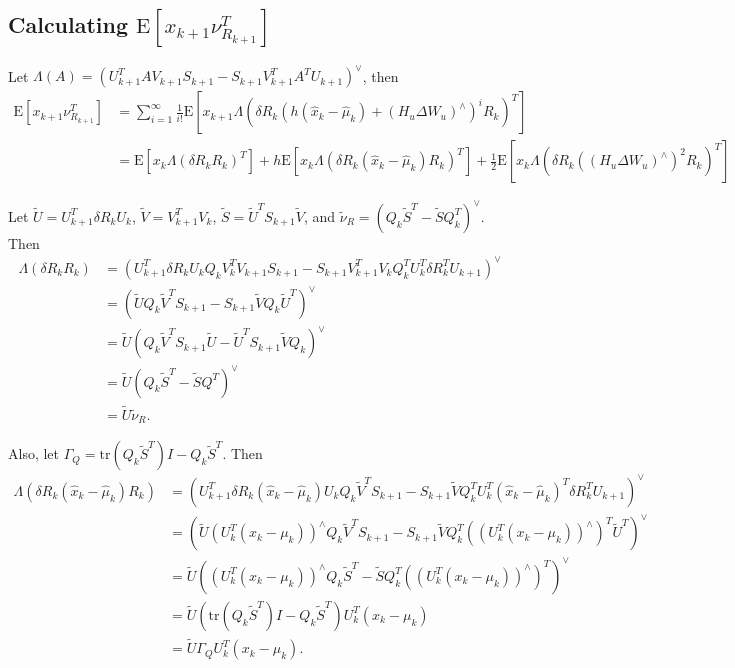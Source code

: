 \documentclass[10pt]{article}
\newcommand{\tr}[1]{\ensuremath{\mathrm{tr}\left( #1 \right)}}
\newcommand{\expect}[1]{\ensuremath{\mathrm{E}\left[ #1 \right]}}
\begin{document}
\subsection{Calculating $\expect{x_{k+1}\nu_{R_{k+1}}^T}$}

Let $\Lambda(A) = (U_{k+1}^TAV_{k+1}S_{k+1}-S_{k+1}V_{k+1}^TA^TU_{k+1})^\vee$, then
\begin{align*}
	\expect{x_{k+1}\nu_{R_{k+1}}^T} &= \sum_{i=1}^\infty \frac{1}{i!} \expect{x_{k+1}\Lambda\left( \delta R_k (h(\hat{x}_k-\hat{\mu}_k)+(H_u\Delta W_u)^\wedge)^i R_k \right)^T} \\
	&= \expect{x_k\Lambda(\delta R_k R_k)^T} + h\expect{x_k\Lambda(\delta R_k(\hat{x}_k-\hat{\mu}_k)R_k)^T} + \frac{1}{2}\expect{x_k\Lambda\left( \delta R_k ((H_u\Delta W_u)^\wedge)^2 R_k \right)^T}
\end{align*}

\noindent Let $\tilde{U} = U_{k+1}^T\delta R_kU_k$, $\tilde{V} = V_{k+1}^TV_k$, $\tilde{S} = \tilde{U}^TS_{k+1}\tilde{V}$, and $\tilde{\nu}_R = (Q_k\tilde{S}^T-\tilde{S}Q_k^T)^\vee$.
Then
\begin{align*}
	\Lambda(\delta R_kR_k) &= (U_{k+1}^T\delta R_kU_kQ_kV_k^TV_{k+1}S_{k+1} - S_{k+1}V_{k+1}^TV_kQ_k^TU_k^T\delta R_k^TU_{k+1})^\vee \\
	&= (\tilde{U}Q_k\tilde{V}^TS_{k+1} - S_{k+1}\tilde{V}Q_k\tilde{U}^T)^\vee \\
	&= \tilde{U}(Q_k\tilde{V}^TS_{k+1}\tilde{U} - \tilde{U}^TS_{k+1}\tilde{V}Q_k)^\vee \\
	&= \tilde{U}(Q_k\tilde{S}^T-\tilde{S}Q^T)^\vee \\
	&= \tilde{U}\tilde{\nu}_R.
\end{align*}

\noindent Also, let $\Gamma_Q = \tr{Q_k\tilde{S}^T}I-Q_k\tilde{S}^T$.
Then
\begin{align*}
	\Lambda(\delta R_k(\hat{x}_k-\hat{\mu}_k)R_k) &= (U_{k+1}^T\delta R_k(\hat{x}_k-\hat{\mu}_k)U_kQ_k\tilde{V}^TS_{k+1} - S_{k+1}\tilde{V}Q_k^TU_k^T(\hat{x}_k-\hat{\mu}_k)^T\delta R_k^TU_{k+1})^\vee \\
	&= (\tilde{U}(U_k^T(x_k-\mu_k))^\wedge Q_k\tilde{V}^TS_{k+1} - S_{k+1}\tilde{V}Q_k^T((U_k^T(x_k-\mu_k))^\wedge)^T\tilde{U}^T)^\vee \\
	&= \tilde{U}((U_k^T(x_k-\mu_k))^\wedge Q_k\tilde{S}^T - \tilde{S}Q_k^T((U_k^T(x_k-\mu_k))^\wedge)^T)^\vee \\
	&= \tilde{U} \left(\tr{Q_k\tilde{S}^T}I - Q_k\tilde{S}^T\right)U_k^T(x_k-\mu_k) \\
	&= \tilde{U}\Gamma_Q U_k^T(x_k-\mu_k).
\end{align*}
\end{document}
